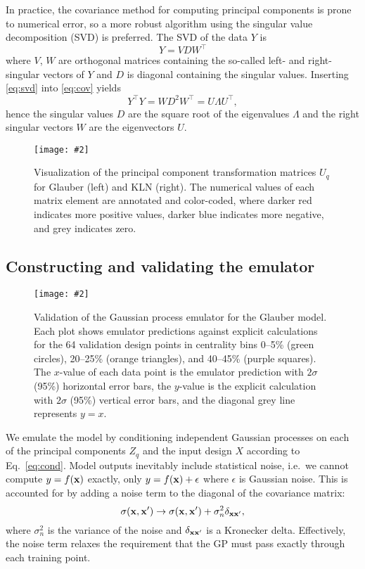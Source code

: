 \documentclass[aps,prc,reprint,superscriptaddress,amsmath]{revtex4-1}
\newcommand{\colfig}[3][t]{
  \begin{figure}[#1]
    \texttt{[image: \#2]}
    \caption{\label{fig:#2}#3}
  \end{figure}
}
\newcommand{\widefig}[3][t]{
  \begin{figure*}[#1]
    \texttt{[image: \#2]}
    \caption{\label{fig:#2}#3}
  \end{figure*}
}
\newcommand{\tran}{^\intercal}
\begin{document}
In practice, the covariance method for computing principal components is prone to numerical error, so a more robust algorithm using the singular value decomposition (SVD) is preferred.
The SVD of the data $Y$ is
\begin{equation}
  Y = VDW\tran
  \label{eq:svd}
\end{equation}
where $V$, $W$ are orthogonal matrices containing the so-called left- and right-singular vectors of $Y$ and $D$ is diagonal containing the singular values.
Inserting \eqref{eq:svd} into \eqref{eq:cov} yields
\begin{equation}
  Y\tran Y = W D^2 W\tran = U \Lambda U\tran,
\end{equation}
hence the singular values $D$ are the square root of the eigenvalues $\Lambda$ and the right singular vectors $W$ are the eigenvectors $U$.

\colfig[b]{pc_matrix}{
  Visualization of the principal component transformation matrices $U_q$ for Glauber (left) and KLN (right).
  The numerical values of each matrix element are annotated and color-coded, where darker red indicates more positive values, darker blue indicates more negative, and grey indicates zero.
}

\subsection{Constructing and validating the emulator}

\widefig{validation}{
  Validation of the Gaussian process emulator for the Glauber model.
  Each plot shows emulator predictions against explicit calculations for the 64 validation design points in centrality bins 0--5\% (green circles), 20--25\% (orange triangles), and 40--45\% (purple squares).
  The $x$-value of each data point is the emulator prediction with $2\sigma$ (95\%) horizontal error bars, the $y$-value is the explicit calculation with $2\sigma$ (95\%) vertical error bars, and the diagonal grey line represents $y = x$.
}

We emulate the model by conditioning independent Gaussian processes on each of the principal components $Z_q$ and the input design $X$ according to Eq.~\eqref{eq:cond}.
Model outputs inevitably include statistical noise, i.e.\ we cannot compute $y = f(\mathbf x)$ exactly, only $y = f(\mathbf x) + \epsilon$ where $\epsilon$ is Gaussian noise.
This is accounted for by adding a noise term to the diagonal of the covariance matrix:
\begin{equation*}
  \sigma(\mathbf x, \mathbf x') \rightarrow \sigma(\mathbf x, \mathbf x') + \sigma^2_n\delta_{\mathbf x\mathbf x'},
\end{equation*}
where $\sigma^2_n$ is the variance of the noise and $\delta_{\mathbf x\mathbf x'}$ is a Kronecker delta.
Effectively, the noise term relaxes the requirement that the GP must pass exactly through each training point.
\end{document}
